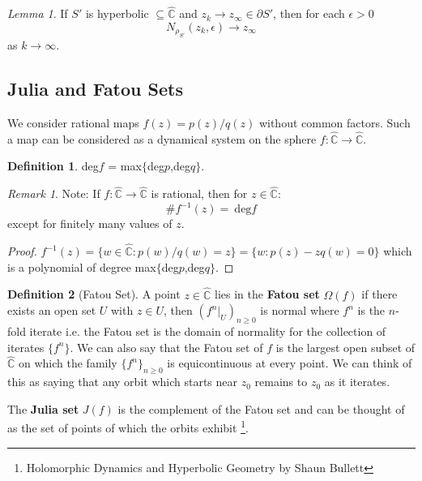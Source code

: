\documentclass[a4paper, 11pt]{book}
\theoremstyle{definition}
\newtheorem{definition}{Definition}[section]
\theoremstyle{remark}
\newtheorem*{remark}{Remark}
\newtheorem{lemma}[theorem]{Lemma}
\begin{document}
    \begin{lemma}
        If $S'$ is hyperbolic $\subseteq \hat{\mathbb{C}}$ and $z_k\to z_{\infty}\in \partial{S'}$, then for each $\epsilon>0$
        \[ N_{\rho_{S'}}(z_k,\epsilon) \to z_{\infty} \]
        as $k\to\infty$.
    \end{lemma}

    \subsection{Julia and Fatou Sets}

    We consider rational maps $f(z)=p(z)/q(z)$ without common factors. Such a map can be considered as a dynamical system
    on the sphere $f:\hat{\mathbb{C}}\to\hat{\mathbb{C}}$.

    \begin{definition}
        deg$f$ = max$\{$deg$p$,deg$q\}$.
    \end{definition}

    \begin{remark}
        Note: If $f:\hat{\mathbb{C}}\to\hat{\mathbb{C}}$ is rational, then for $z\in\hat{\mathbb{C}}$:
        \[ \#f^{-1}(z) =\:\text{deg}f \]
        except for finitely many values of $z$.
    \end{remark}

    \begin{proof}
        $f^{-1}(z) = \{w\in\hat{\mathbb{C}}:p(w)/q(w) = z\} = \{w:p(z)-zq(w)=0\}$ which is a polynomial of degree
        max$\{$deg$p$,deg$q\}$.
    \end{proof}

    \begin{definition}[Fatou Set]
        A point $z\in\hat{\mathbb{C}}$ lies in the \textbf{Fatou set} $\Omega(f)$ if there exists an open set $U$ with $z\in U$,
        then $(f^n|_U)_{n\geq 0}$ is normal where $f^n$ is the $n$-fold iterate i.e. the Fatou set is the domain of normality
        for the collection of iterates $\{f^n\}$. We can also say that the Fatou set of $f$ is the largest open subset of
        $\hat{\mathbb{C}}$ on which the family $\{f^n\}_{n\geq 0}$ is equicontinuous at every point. We can think of this as
        saying that any orbit which starts near $z_0$ remains  to $z_0$ as it iterates.
    \end{definition}

    The \textbf{Julia set} $J(f)$ is the complement of the Fatou set and can be thought of as the set of points of which the orbits
    exhibit  \footnote{Holomorphic Dynamics and Hyperbolic Geometry by Shaun Bullett}.
\end{document}
